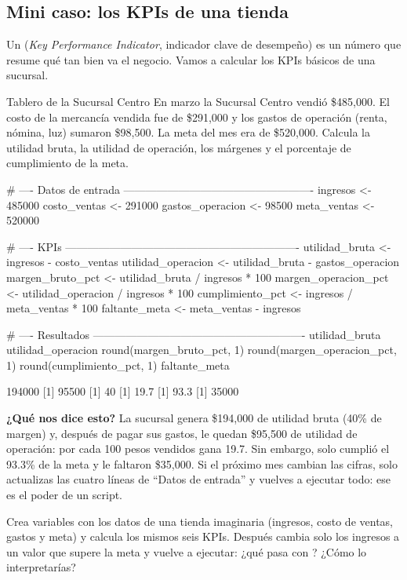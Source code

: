 \subsection{Mini caso: los KPIs de una tienda}

Un  (\emph{Key Performance Indicator}, indicador clave de
desempeño) es un número que resume qué tan bien va el negocio. Vamos a
calcular los KPIs básicos de una sucursal.

\begin{ejemplo}{Tablero de la Sucursal Centro}
En marzo la Sucursal Centro vendió \$485,000. El costo de la mercancía
vendida fue de \$291,000 y los gastos de operación (renta, nómina, luz)
sumaron \$98,500. La meta del mes era de \$520,000. Calcula la utilidad
bruta, la utilidad de operación, los márgenes y el porcentaje de
cumplimiento de la meta.
\end{ejemplo}

\begin{rcode}
# ---- Datos de entrada ----------------------------------------------------
ingresos <- 485000
costo_ventas <- 291000
gastos_operacion <- 98500
meta_ventas <- 520000

# ---- KPIs ----------------------------------------------------------------
utilidad_bruta <- ingresos - costo_ventas
utilidad_operacion <- utilidad_bruta - gastos_operacion
margen_bruto_pct <- utilidad_bruta / ingresos * 100
margen_operacion_pct <- utilidad_operacion / ingresos * 100
cumplimiento_pct <- ingresos / meta_ventas * 100
faltante_meta <- meta_ventas - ingresos

# ---- Resultados ----------------------------------------------------------
utilidad_bruta
utilidad_operacion
round(margen_bruto_pct, 1)
round(margen_operacion_pct, 1)
round(cumplimiento_pct, 1)
faltante_meta
\end{rcode}
\begin{rsalida}
[1] 194000
[1] 95500
[1] 40
[1] 19.7
[1] 93.3
[1] 35000
\end{rsalida}

\textbf{¿Qué nos dice esto?} La sucursal genera \$194,000 de utilidad bruta
(40\% de margen) y, después de pagar sus gastos, le quedan \$95,500 de
utilidad de operación: por cada 100 pesos vendidos gana 19.7. Sin embargo,
solo cumplió el 93.3\% de la meta y le faltaron \$35,000. Si el próximo mes
cambian las cifras, solo actualizas las cuatro líneas de ``Datos de
entrada'' y vuelves a ejecutar todo: ese es el poder de un script.

\begin{hazlotu}
Crea variables con los datos de una tienda imaginaria (ingresos, costo de
ventas, gastos y meta) y calcula los mismos seis KPIs. Después cambia solo
los ingresos a un valor que supere la meta y vuelve a ejecutar: ¿qué pasa
con ? ¿Cómo lo interpretarías?
\end{hazlotu}

